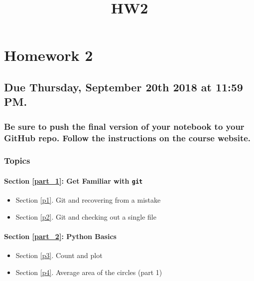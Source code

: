 \documentclass[11pt]{article}
\title{HW2}
\providecommand{\tightlist}{%
      \setlength{\itemsep}{0pt}\setlength{\parskip}{0pt}}
\begin{document}
    
    
    \maketitle
    
    

    
    \section{Homework 2}\label{homework-2}

\subsection{Due Thursday, September 20th 2018 at 11:59
PM.}\label{due-thursday-september-20th-2018-at-1159-pm.}

\subsubsection{Be sure to push the final version of your notebook to
your GitHub repo. Follow the instructions on the course
website.}\label{be-sure-to-push-the-final-version-of-your-notebook-to-your-github-repo.-follow-the-instructions-on-the-course-website.}

\subsubsection{Topics}\label{topics}

\paragraph{\texorpdfstring{Section \ref{part_1}: Get Familiar with
\texttt{git}}{: Get Familiar with git}}\label{part-1-get-familiar-with-git}

\begin{itemize}
\tightlist
\item
  Section \ref{p1}. Git and recovering from a mistake
\item
  Section \ref{p2}. Git and checking out a single file
\end{itemize}

\paragraph{\texorpdfstring{Section \ref{part_2}: Python
Basics}{: Python Basics}}\label{part-2-python-basics}

\begin{itemize}
\tightlist
\item
  Section \ref{p3}. Count and plot
\item
  Section \ref{p4}. Average area of the circles (part 1)
\end{itemize}
\end{document}
